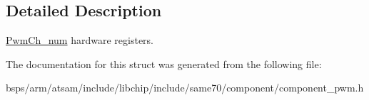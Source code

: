 \subsection{Detailed Description}
\mbox{\hyperlink{structPwmCh__num}{Pwm\+Ch\+\_\+num}} hardware registers. 

The documentation for this struct was generated from the following file\+:\begin{DoxyCompactItemize}
\item 
bsps/arm/atsam/include/libchip/include/same70/component/component\+\_\+pwm.\+h\end{DoxyCompactItemize}
